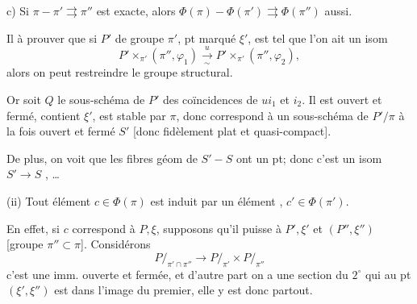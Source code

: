 c) Si $\pi\mathbin{-}\pi'\rightrightarrows\pi''$ est exacte, alors \deleted{$\unsure{\Pi|\Phi}$} $\Phi(\pi)\mathbin{-}\Phi(\pi')\rightrightarrows\Phi(\pi'')$ aussi.

Il  à prouver que si $P'$ de groupe $\pi'$, pt marqué $\xi'$, est tel que  l'on ait un isom
\[
P'\times_{\pi'}(\pi'',\varphi_1)\xrightarrow[\sim]{u}
P'\times_{\pi'}(\pi'',\varphi_2),
\]
alors on peut restreindre le groupe structural.

Or soit $Q$ le sous-schéma de $P'$ des coïncidences de $u i_1$ et $i_2$. Il est ouvert et fermé, contient $\xi'$, est stable par $\pi$, donc correspond à un sous-schéma de $P'/\pi$ à la fois ouvert et fermé $S'$ [donc  fidèlement plat et quasi-compact].


De plus, on voit que les  fibres géom de $S'\mathbin{-}S$ ont  un pt; donc c'est un isom $S'\to S$ , \ldots
{}

(ii) Tout élément $c\in\Phi(\pi)$ est induit par un élément , $c'\in\Phi(\pi')$.


En effet, si $c$ correspond à $P,\xi$, supposons  qu'il puisse   à $P',\xi'$  et $(P'',\xi'')$ [groupe $\pi''\subset\pi$].
Considérons
\[
P/_{\pi'\cap\pi''}\longrightarrow P/_{\pi'}\times P/_{\pi''}
\]
c'est une imm. ouverte et fermée, et d'autre part on a une section du $2^\circ$  qui  au pt $(\xi',\xi'')$ est dans l'image du premier, elle y est donc partout.

